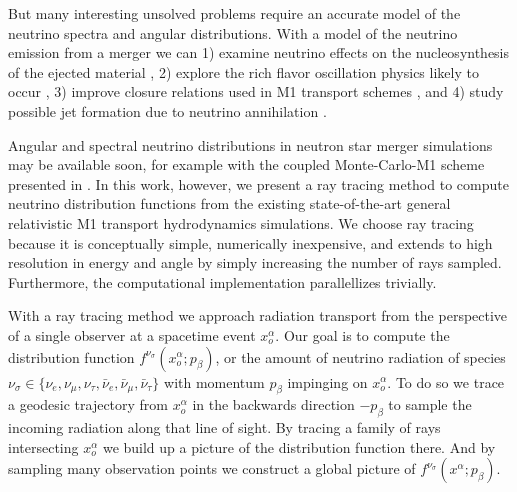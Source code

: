 \documentclass[aps,floatfix,prd,superscriptaddress,twocolumn]{revtex4-1}
\begin{document}
But many interesting unsolved problems require an accurate model of the neutrino
spectra and angular distributions.
With a model of the neutrino emission from a merger we can
1) examine neutrino effects on the nucleosynthesis of the ejected material
\citep{surm2011-nickel_56, robe2016-sph_nu_nucleo},
2) explore the rich flavor oscillation physics likely to occur
\citep{malk2012-mnr_1, malk2015-mnr_2, malk2016-mnr_3, zhu2016-mnr_nsns_remnant,
  vaan2016-uncovering_mnr},
3) improve closure relations used in M1 transport schemes
\citep{ramp2002-truncated_moment, shib2011-truncated_moment,
  card2013-truncated_moment, fouc2015-m1_nsbh, ocon2015-gr1d_with_nu}, and
4) study possible jet formation due to neutrino annihilation
\citep{ruff1999-nunubar_nsns, asan2000-nunubar, birk2007-nunubar,
  hari2010-gr_nunubar_collapsar, zala2011-nunubar, leng2014-nunubar,
  just2016-nsns_ejecta_obstacles}.

Angular and spectral neutrino distributions in neutron star merger simulations may
be available soon, for example with the coupled Monte-Carlo-M1 scheme presented in
\citep{fouc2017-m1_with_mc}.
In this work, however, we present a ray tracing method to compute neutrino
distribution functions from the existing state-of-the-art general relativistic M1
transport hydrodynamics simulations.
We choose ray tracing because it is conceptually simple,
numerically inexpensive,
and extends to high resolution in energy and angle
by simply increasing the number of rays sampled.
Furthermore, the computational implementation parallellizes trivially.

With a ray tracing method we approach radiation transport from the perspective
of a single observer at a spacetime event $x_o^\alpha$.
Our goal is to compute the distribution function
$f^{\nu_\sigma}(x_o^\alpha;p_\beta)$, or the amount of neutrino radiation
of species
$\nu_\sigma\in\{\nu_e,\nu_\mu,\nu_\tau,\bar{\nu}_e,\bar{\nu}_\mu,\bar{\nu}_\tau\}$
with momentum $p_\beta$ impinging on $x_o^\alpha$.
To do so we trace a geodesic trajectory from $x_o^\alpha$ in the backwards
direction $-p_\beta$ to sample the incoming radiation along that line of sight.
By tracing a family of rays intersecting $x_o^\alpha$ we build up a
picture of the distribution function there.
And by sampling many observation points we construct a global picture
of $f^{\nu_\sigma}(x^\alpha;p_\beta)$.
\end{document}
